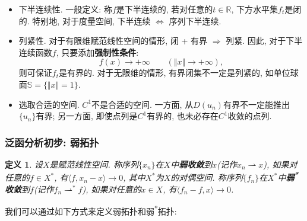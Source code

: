 \documentclass[12pt,a4paper]{article}
\newtheorem{definition}[theorem]{定义}
\begin{document}
\begin{itemize}
    \item 下半连续性. 一般定义: 称$f$是下半连续的, 若对任意的$t \in \mathbb{R}$, 下方水平集$f_t$是闭的.
    特别地, 对于度量空间, 下半连续 $\Leftrightarrow$ 序列下半连续.
    \item 列紧性. 对于有限维赋范线性空间的情形, 闭 + 有界 $\Rightarrow$ 列紧. 因此, 对于下半连续函数$f$, 只要添加\textbf{强制性条件}:
    \begin{equation*}
        f(x) \rightarrow +\infty \qquad (\Vert x \Vert \rightarrow +\infty),
    \end{equation*}
    则可保证$f_t$是有界的. 对于无限维的情形, 有界闭集不一定是列紧的, 如单位球面$\mathbb{S} = \{\Vert x \Vert = 1\}$.
    \item 选取合适的空间. $C^1$不是合适的空间. 一方面, 从$D(u_n)$有界不一定能推出$\{u_n\}$有界; 另一方面, 即使点列是$C^1$有界的, 也未必存在$C^1$收敛的点列.
\end{itemize}

\subsubsection{泛函分析初步: 弱拓扑}

\begin{definition}\label{def2.3}
    设$X$是赋范线性空间. 称序列$\{x_n\}$在$X$中\textbf{弱收敛}到$x$(记作$x_n \rightharpoonup x$), 如果对任意的$f \in X^*$, 有$\langle f, x_n - x\rangle \rightarrow 0$, 其中$X^*$为$X$的对偶空间.
    称序列$\{f_n\}$在$X^*$中\textbf{弱\textsuperscript{*}收敛}到$f$(记作$f_n \rightharpoonup^* f$), 如果对任意的$x \in X$, 有$\langle f_n - f, x\rangle \rightarrow 0$.
\end{definition}

我们可以通过如下方式来定义弱拓扑和弱\textsuperscript{*}拓扑: 
\end{document}
